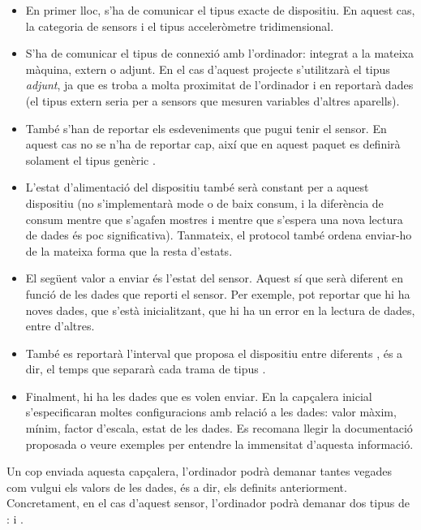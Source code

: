\begin{itemize}
    \item En primer lloc, s'ha de comunicar el tipus exacte de dispositiu. En
    aquest cas, la categoria de sensors i el tipus acceleròmetre tridimensional.
    \item S'ha de comunicar el tipus de connexió amb l'ordinador: integrat a
    la mateixa màquina, extern o adjunt. En el cas d'aquest projecte s'utilitzarà
    el tipus \emph{adjunt}, ja que es troba a molta proximitat de l'ordinador
    i en reportarà dades (el tipus extern seria per a sensors que
    mesuren variables d'altres aparells).
    \item També s'han de reportar els esdeveniments que pugui tenir el sensor.
    En aquest cas no se n'ha de reportar cap, així que en aquest paquet
    es definirà solament el tipus genèric .
    \item L'estat d'alimentació del dispositiu també serà constant per a
    aquest dispositiu (no s'implementarà mode  o de baix consum, i
    la diferència de consum mentre que s'agafen mostres i mentre que
    s'espera una nova lectura de dades és poc significativa). Tanmateix, el
    protocol també ordena enviar-ho de la mateixa forma que la resta d'estats.
    \item El següent valor a enviar és l'estat del sensor. Aquest sí que serà
    diferent en funció de les dades que reporti el sensor. Per exemple, pot
    reportar que hi ha noves dades, que s'està inicialitzant, que hi ha un
    error en la lectura de dades, entre d'altres.
    \item També es reportarà l'interval que proposa el dispositiu entre
    diferents , és a dir, el temps que separarà cada trama de
    tipus .
    \item Finalment, hi ha les dades que es volen enviar. En la capçalera inicial
    s'especificaran moltes configuracions amb relació a les dades: valor màxim,
    mínim, factor d'escala, estat de les dades. Es recomana llegir la
    documentació proposada o veure exemples per entendre la immensitat
    d'aquesta informació.
\end{itemize}

Un cop enviada aquesta capçalera,
l'ordinador podrà demanar tantes vegades com vulgui els valors de les dades, és
a dir, els  definits anteriorment.
Concretament, en el cas d'aquest sensor, l'ordinador podrà demanar dos tipus
de :  i .

